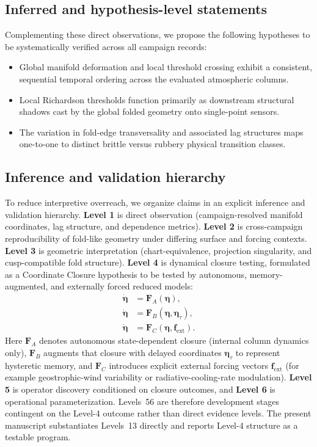 \documentclass[12pt,a4paper]{article}
\newcommand{\vect}[1]{\mathbf{#1}}
\begin{document}
\subsection{Inferred and hypothesis-level statements}

Complementing these direct observations, we propose the following hypotheses to be systematically verified across all campaign records:
\begin{itemize}
  \item Global manifold deformation and local threshold crossing exhibit a consistent, sequential temporal ordering across the evaluated atmospheric columns.
  \item Local Richardson thresholds function primarily as downstream structural shadows cast by the global folded geometry onto single-point sensors.
  \item The variation in fold-edge transversality and associated lag structures maps one-to-one to distinct brittle versus rubbery physical transition classes.
\end{itemize}

\subsection{Inference and validation hierarchy}

To reduce interpretive overreach, we organize claims in an explicit inference and validation hierarchy. \textbf{Level 1} is direct observation (campaign-resolved manifold coordinates, lag structure, and dependence metrics). \textbf{Level 2} is cross-campaign reproducibility of fold-like geometry under differing surface and forcing contexts. \textbf{Level 3} is geometric interpretation (chart-equivalence, projection singularity, and cusp-compatible fold structure). \textbf{Level 4} is dynamical closure testing, formulated as a Coordinate Closure hypothesis to be tested by autonomous, memory-augmented, and externally forced reduced models:
\begin{align}
\dot{\boldsymbol{\eta}} &= \vect{F}_A(\boldsymbol{\eta}), \\
\dot{\boldsymbol{\eta}} &= \vect{F}_B(\boldsymbol{\eta},\boldsymbol{\eta}_{\tau}), \\
\dot{\boldsymbol{\eta}} &= \vect{F}_C(\boldsymbol{\eta},\vect{f}_{\mathrm{ext}}).
\end{align}
Here $\vect{F}_A$ denotes autonomous state-dependent closure (internal column dynamics only), $\vect{F}_B$ augments that closure with delayed coordinates $\boldsymbol{\eta}_{\tau}$ to represent hysteretic memory, and $\vect{F}_C$ introduces explicit external forcing vectors $\vect{f}_{\mathrm{ext}}$ (for example geostrophic-wind variability or radiative-cooling-rate modulation).
\textbf{Level 5} is operator discovery conditioned on closure outcomes, and \textbf{Level 6} is operational parameterization. Levels~5\text{--}6 are therefore development stages contingent on the Level-4 outcome rather than direct evidence levels. The present manuscript substantiates Levels~1\text{--}3 directly and reports Level-4 structure as a testable program.
\end{document}
